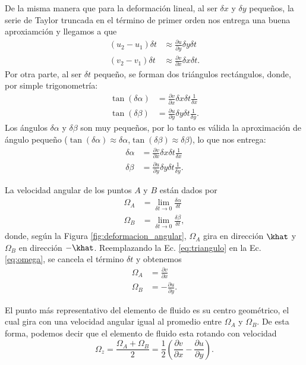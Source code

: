 De la misma manera que para la deformación lineal, al ser $\delta x$ y $\delta y$ pequeños, la serie de Taylor truncada en el término de primer orden nos entrega una buena aproxiamción y llegamos a que
%
\begin{align}
(u_2-u_1)\delta t &\approx \frac{\partial u}{\partial y} \delta y\delta t \nonumber \\
(v_2-v_1)\delta t &\approx \frac{\partial v}{\partial x} \delta x\delta t.
\end{align}
%
Por otra parte, al ser $\delta t$ pequeño, se forman dos triángulos rectángulos, donde, por simple trigonometría:
%
\begin{align}
\tan (\delta \alpha) &= \frac{\partial v}{\partial x} \delta x\delta t\frac{1}{\delta x}\nonumber \\
\tan (\delta \beta) &= \frac{\partial u}{\partial y} \delta y\delta t\frac{1}{\delta y}.
\end{align}
%
Los ángulos $\delta \alpha$ y $\delta \beta$ son muy pequeños, por lo tanto es válida la aproximación de ángulo pequeño ($\tan (\delta \alpha)\approx\delta\alpha$,$\tan (\delta \beta)\approx\delta\beta$), lo que nos entrega:
%
\begin{align}\label{eq:triangulo}
\delta \alpha &= \frac{\partial v}{\partial x} \delta x\delta t\frac{1}{\delta x}\nonumber \\
\delta\beta &= \frac{\partial u}{\partial y} \delta y\delta t\frac{1}{\delta y}.
\end{align}

La velocidad angular de los puntos $A$ y $B$ están dados por 
%
\begin{align}\label{eq:omega}
\Omega_A &= \lim_{\delta t\to 0}\frac{\delta \alpha}{\delta t} \nonumber \\
\Omega_B &= \lim_{\delta t\to 0}\frac{\delta \beta}{\delta t},
\end{align}
%
donde, según la Figura \ref{fig:deformacion_angular}, $\Omega_A$ gira en dirección $\khat$ y $\Omega_B$ en dirección $-\khat$.
Reemplazando la Ec. \eqref{eq:triangulo} en la Ec. \eqref{eq:omega}, se cancela el término $\delta t$ y obtenemos
%
\begin{align}
\Omega_A &= \frac{\partial v}{\partial x}\nonumber \\
\Omega_B &= -\frac{\partial u}{\partial y}.
\end{align}

El punto más representativo del elemento de fluido es su centro geométrico, el cual gira con una velocidad angular igual al promedio entre $\Omega_A$ y $\Omega_B$. 
De esta forma, podemos decir que el elemento de fluido esta rotando con velocidad 
%
\begin{equation}\label{eq:omega_z}
\Omega_z = \frac{\Omega_A+\Omega_B}{2} = \frac{1}{2}\left(\frac{\partial v}{\partial x}-\frac{\partial u}{\partial y}\right).
\end{equation}

